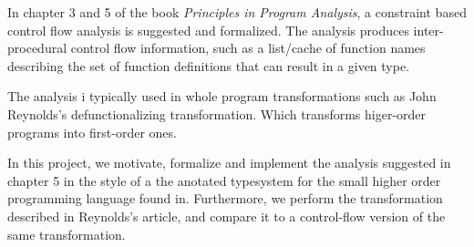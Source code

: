 
In chapter 3 and 5 of the book {\it Principles in Program Analysis}\cite{PoPA},
a constraint based control flow analysis is suggested and formalized.
The analysis produces inter-procedural control flow information,
such as a list/cache of function names describing the set
of function definitions that can result in a given type.

The analysis i typically used in whole program transformations such as
John Reynolds's defunctionalizing transformation\cite{Reynolds1968,Reynolds1998}.
Which transforms higer-order programs into first-order ones.

In this project, we motivate, formalize and implement the analysis suggested in
chapter 5 in the style of a the anotated typesystem for the small higher
order programming language found in\cite{fun}.
Furthermore, we perform the transformation described in
Reynolds's article\cite{Reynolds1968},
and compare it to a control-flow version of the same transformation.
